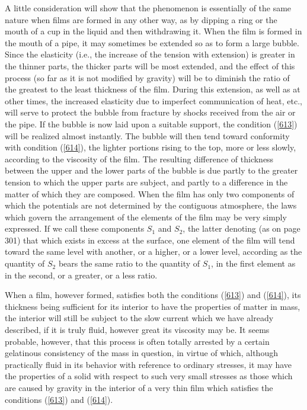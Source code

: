\documentclass[12pt]{article}
\begin{document}
A little consideration will show that the phenomenon is essentially of the same nature when films are formed in any other way, as by dipping a ring or the mouth of a cup in the liquid and then withdrawing it. When the film is formed in the mouth of a pipe, it may sometimes be extended so as to form a large bubble. Since the elasticity (i.e., the increase of the tension with extension) is greater in the thinner parts, the thicker parts will be most extended, and the effect of this process (so far as it is not modified by gravity) will be to diminish the ratio of the greatest to the least thickness of the film. During this extension, as well as at other times, the increased elasticity due to imperfect communication of heat, etc., will serve to protect the bubble from fracture by shocks received from the air or the pipe. If the bubble is now laid upon a suitable support, the condition (\ref{613}) will be realized almost instantly. The bubble will then tend toward conformity with condition (\ref{614}), the lighter portions rising to the top, more or less slowly, according to the viscosity of the film. The resulting difference of thickness between the upper and the lower parts of the bubble is due partly to the greater tension to which the upper parts are subject, and partly to a difference in the matter of which they are composed. When the film has only two components of which the potentials are not determined by the contiguous atmosphere, the laws which govern the arrangement of the elements of the film may be very simply expressed. If we call these components $S_1$ and $S_2$, the latter denoting (as on page 301) that which exists in excess at the surface, one element of the film will tend toward the same level with another, or a higher, or a lower level, according as the quantity of $S_2$ bears the same ratio to the quantity of $S_1$, in the first element as in the second, or a greater, or a less ratio. 

When a film, however formed, satisfies both the conditions (\ref{613}) and (\ref{614}), its thickness being sufficient for its interior to have the properties of matter in mass, the interior will still be subject to the slow current which we have already described, if it is truly fluid, however great its viscosity may be. It seems probable, however, that this process is often totally arrested by a certain gelatinous consistency of the mass in question, in virtue of which, although practically fluid in its behavior with reference to ordinary stresses, it may have the properties of a solid with respect to such very small stresses as those which are caused by gravity in the interior of a very thin film which satisfies the conditions (\ref{613}) and (\ref{614}).
\end{document}
